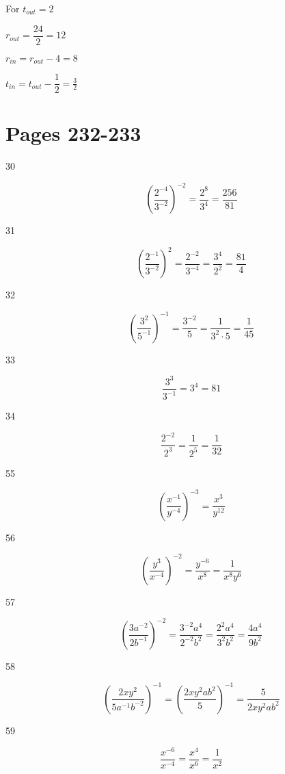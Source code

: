 \documentclass[fleqn,addpoints]{exam}
\begin{document}
\begin{description}
For $t_{out} = 2$
\begin{itemize*}
  \item $r_{out} = \dfrac{24}{2} = 12$
  \item $r_{in} = r_{out} - 4 = 8$
  \item $t_{in} = t_{out} - \dfrac{1}{2} = \frac{3}{2}$
\end{itemize*}

\end{description}

\pagebreak

\section{Pages 232-233}

\begin{description}

\item[30]
\[
\left( \frac{2^{-4}}{3^{-2}} \right)^{-2} = \frac{2^8}{3^4} = \frac{256}{81}
\]

\item[31]
\[
  \left( \frac{2^{-1}}{3^{-2}} \right)^2 = \frac{2^{-2}}{3^{-4}} = \frac{3^4}{2^2} = \frac{81}{4}
\]

\item[32]
\[
  \left( \frac{3^2}{5^{-1}} \right)^{-1} = \frac{3^{-2}}{5} = \frac{1}{3^2 \cdot 5} = \frac{1}{45}
\]

\item[33]
\[
  \frac{3^3}{3^{-1}} = 3^4 = 81
\]

\item[34]
\[
  \frac{2^{-2}}{2^3} = \frac{1}{2^5} = \frac{1}{32}
\]

\item[55]
\[
  \left( \frac{x^{-1}}{y^{-4}} \right)^{-3} = \frac{x^3}{y^{12}}
\]

\item[56]
\[
  \left( \frac{y^3}{x^{-4}} \right)^{-2} = \frac{y^{-6}}{x^8} = \frac{1}{x^8y^6}
\]

\item[57]
\[
  \left( \frac{3a^{-2}}{2b^{-1}} \right)^{-2} = \frac{3^{-2}a^4}{2^{-2}b^2} = \frac{2^2a^4}{3^2b^2} = \frac{4a^4}{9b^2}
\]

\item[58]
\[
  \left( \frac{2xy^2}{5a^{-1}b^{-2}} \right)^{-1} = \left( \frac{2xy^2ab^2}{5} \right)^{-1} = \frac{5}{2xy^2ab^2}
\]

\item[59]
\[
  \frac{x^{-6}}{x^{-4}} = \frac{x^4}{x^6} = \frac{1}{x^2}
\]


\end{description}
\end{document}
